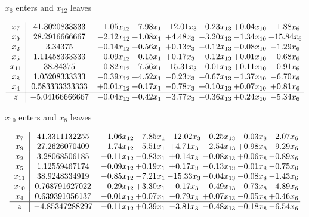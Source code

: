 \documentclass[9pt]{article}
\begin{document}
 $ x_{8} $ enters and $ x_{12} $ leaves 

 \[\begin{array}{c| c c@{\hskip 2pt} c@{\hskip 2pt} c@{\hskip 2pt} c@{\hskip 2pt} c@{\hskip 2pt} c@{\hskip 2pt} }
 x_{7}   &  41.3020833333 & -1.05 x_{12} & -7.98 x_{1} & -12.01 x_{3} & -0.23 x_{13} & +  0.04 x_{10} & -1.88 x_{6}\\
 x_{9}   &  28.2916666667 & -2.12 x_{12} & -1.08 x_{1} & +  4.48 x_{3} & -3.20 x_{13} & -1.34 x_{10} & -15.84 x_{6}\\
 x_{2}   &  3.34375 & -0.14 x_{12} & -0.56 x_{1} & +  0.13 x_{3} & -0.12 x_{13} & -0.08 x_{10} & -1.29 x_{6}\\
 x_{5}   &  1.11458333333 & -0.09 x_{12} & +  0.15 x_{1} & +  0.17 x_{3} & -0.12 x_{13} & +  0.01 x_{10} & -0.68 x_{6}\\
 x_{11}   &  38.84375 & -0.82 x_{12} & -7.56 x_{1} & -15.31 x_{3} & +  0.01 x_{13} & +  0.11 x_{10} & -0.91 x_{6}\\
 x_{8}   &  1.05208333333 & -0.39 x_{12} & +  4.52 x_{1} & -0.23 x_{3} & -0.67 x_{13} & -1.37 x_{10} & -6.70 x_{6}\\
 x_{4}   &  0.583333333333 & +  0.01 x_{12} & -0.17 x_{1} & -0.78 x_{3} & +  0.10 x_{13} & +  0.07 x_{10} & +  0.81 x_{6}\\
\hline
z    &  -5.04166666667 & -0.04 x_{12} & -0.42 x_{1} & -3.77 x_{3} & -0.36 x_{13} & +  0.24 x_{10} & -5.34 x_{6}\\
\end{array}\]


 $ x_{10} $ enters and $ x_{8} $ leaves 

 \[\begin{array}{c| c c@{\hskip 2pt} c@{\hskip 2pt} c@{\hskip 2pt} c@{\hskip 2pt} c@{\hskip 2pt} c@{\hskip 2pt} }
 x_{7}   &  41.3311132255 & -1.06 x_{12} & -7.85 x_{1} & -12.02 x_{3} & -0.25 x_{13} & -0.03 x_{8} & -2.07 x_{6}\\
 x_{9}   &  27.2626070409 & -1.74 x_{12} & -5.51 x_{1} & +  4.71 x_{3} & -2.54 x_{13} & +  0.98 x_{8} & -9.29 x_{6}\\
 x_{2}   &  3.28068506185 & -0.11 x_{12} & -0.83 x_{1} & +  0.14 x_{3} & -0.08 x_{13} & +  0.06 x_{8} & -0.89 x_{6}\\
 x_{5}   &  1.12559467174 & -0.09 x_{12} & +  0.19 x_{1} & +  0.17 x_{3} & -0.13 x_{13} & -0.01 x_{8} & -0.75 x_{6}\\
 x_{11}   &  38.9248334919 & -0.85 x_{12} & -7.21 x_{1} & -15.33 x_{3} & -0.04 x_{13} & -0.08 x_{8} & -1.43 x_{6}\\
 x_{10}   &  0.768791627022 & -0.29 x_{12} & +  3.30 x_{1} & -0.17 x_{3} & -0.49 x_{13} & -0.73 x_{8} & -4.89 x_{6}\\
 x_{4}   &  0.639391056137 & -0.01 x_{12} & +  0.07 x_{1} & -0.79 x_{3} & +  0.07 x_{13} & -0.05 x_{8} & +  0.46 x_{6}\\
\hline
z    &  -4.85347288297 & -0.11 x_{12} & +  0.39 x_{1} & -3.81 x_{3} & -0.48 x_{13} & -0.18 x_{8} & -6.54 x_{6}\\
\end{array}\]
\end{document}

